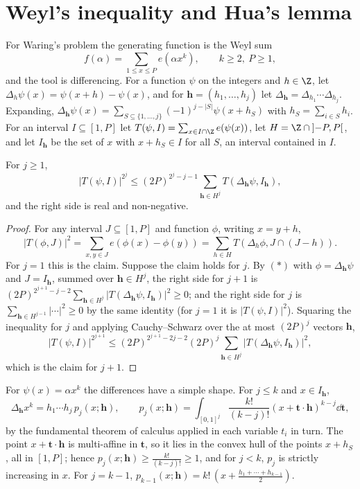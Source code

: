 \section{Weyl's inequality and Hua's lemma}

For Waring's problem the generating function is the Weyl sum
\[
f(\alpha)=\sum_{1\le x\le P}e(\alpha x^k),\qquad k\ge2,\ P\ge1,
\]
and the tool is differencing. For a function $\psi$ on the integers and $h\in\Z$, let $\Delta_h\psi(x)=\psi(x+h)-\psi(x)$, and for $\mathbf h=(h_1,\dots,h_j)$ let $\Delta_{\mathbf h}=\Delta_{h_1}\cdots\Delta_{h_j}$. Expanding, $\Delta_{\mathbf h}\psi(x)=\sum_{S\subseteq\{1,\dots,j\}}(-1)^{j-|S|}\psi(x+h_S)$ with $h_S=\sum_{i\in S}h_i$. For an interval $I\subseteq[1,P]$ let $T(\psi,I)=\sum_{x\in I\cap\Z}e(\psi(x))$, let $H=\Z\cap\left]-P,P\right[$, and let $I_{\mathbf h}$ be the set of $x$ with $x+h_S\in I$ for all $S$, an interval contained in $I$.

\begin{lemma}\label{lem:weyldiff}
For $j\ge1$,
\[
|T(\psi,I)|^{2^j}\le(2P)^{2^j-j-1}\sum_{\mathbf h\in H^j}T(\Delta_{\mathbf h}\psi,I_{\mathbf h}),
\]
and the right side is real and non-negative.
\end{lemma}
\begin{proof}
For any interval $J\subseteq[1,P]$ and function $\phi$, writing $x=y+h$,
\[
|T(\phi,J)|^2=\sum_{x,y\in J}e(\phi(x)-\phi(y))=\sum_{h\in H}T(\Delta_h\phi,J\cap(J-h)).\tag{$\ast$}
\]
For $j=1$ this is the claim. Suppose the claim holds for $j$. By $(\ast)$ with $\phi=\Delta_{\mathbf h}\psi$ and $J=I_{\mathbf h}$, summed over $\mathbf h\in H^j$, the right side for $j+1$ is $(2P)^{2^{j+1}-j-2}\sum_{\mathbf h\in H^j}|T(\Delta_{\mathbf h}\psi,I_{\mathbf h})|^2\ge0$; and the right side for $j$ is $\sum_{\mathbf h\in H^{j-1}}|\cdots|^2\ge0$ by the same identity (for $j=1$ it is $|T(\psi,I)|^2$). Squaring the inequality for $j$ and applying Cauchy--Schwarz over the at most $(2P)^j$ vectors $\mathbf h$,
\[
|T(\psi,I)|^{2^{j+1}}\le(2P)^{2^{j+1}-2j-2}(2P)^j\sum_{\mathbf h\in H^j}|T(\Delta_{\mathbf h}\psi,I_{\mathbf h})|^2,
\]
which is the claim for $j+1$.
\end{proof}

For $\psi(x)=\alpha x^k$ the differences have a simple shape. For $j\le k$ and $x\in I_{\mathbf h}$,
\[
\Delta_{\mathbf h}x^k=h_1\cdots h_j\,p_j(x;\mathbf h),\qquad p_j(x;\mathbf h)=\int_{[0,1]^j}\frac{k!}{(k-j)!}(x+\mathbf t\cdot\mathbf h)^{k-j}\dd\mathbf t,\tag{7.1}
\]
by the fundamental theorem of calculus applied in each variable $t_i$ in turn. The point $x+\mathbf t\cdot\mathbf h$ is multi-affine in $\mathbf t$, so it lies in the convex hull of the points $x+h_S$, all in $[1,P]$; hence $p_j(x;\mathbf h)\ge\frac{k!}{(k-j)!}\ge1$, and for $j<k$, $p_j$ is strictly increasing in $x$. For $j=k-1$, $p_{k-1}(x;\mathbf h)=k!\,(x+\frac{h_1+\cdots+h_{k-1}}2)$.

